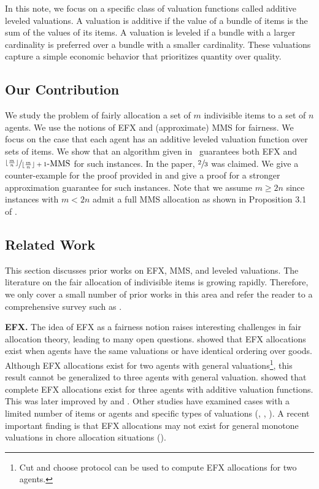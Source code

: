 \documentclass{article}
\theoremstyle{definition}
\begin{document}
In this note, we focus on a specific class of valuation functions called additive leveled valuations. A valuation is additive if the value of a bundle of items is the sum of the values of its items. A valuation is leveled if a bundle with a larger cardinality is preferred over a bundle with a smaller cardinality. These valuations capture a simple economic behavior that prioritizes quantity over quality.

\subsection{Our Contribution}

We study the problem of fairly allocation a set of $m$ indivisible items to a set of $n$ agents. We use the notions of EFX and (approximate) MMS for fairness. We focus on the case that each agent has an additive leveled valuation function over sets of items. We show that an algorithm given in~\cite{christodoulou2024fairtruthfulallocationsleveled} guarantees both EFX and $\sfrac{\lfloor \frac{m}{n} \rfloor}{\lfloor \frac{m}{n} \rfloor + 1}\text{-MMS}$ for such instances. In the paper, $\sfrac{2}{3}$ was claimed. We give a counter-example for the proof provided in \cite{christodoulou2024fairtruthfulallocationsleveled} and give a proof for a stronger approximation guarantee for such instances. Note that we assume $m \ge 2n$ since instances with $m < 2n$ admit a full MMS allocation as shown in Proposition 3.1 of \cite{christodoulou2024fairtruthfulallocationsleveled}.

\subsection{Related Work}

This section discusses prior works on EFX, MMS, and leveled valuations. The literature on the fair allocation of indivisible items is growing rapidly. Therefore, we only cover a small number of prior works in this area and refer the reader to a comprehensive survey such as \cite{Amanatidis_2023}.


\textbf{EFX.}
The idea of EFX as a fairness notion raises interesting challenges in fair allocation theory, leading to many open questions. \cite{DBLP:journals/corr/PlautR17} showed that EFX allocations exist when agents have the same valuations or have identical ordering over goods. Although EFX allocations exist for two agents with general valuations\footnote{Cut and choose protocol can be used to compute EFX allocations for two agents.}, this result cannot be generalized to three agents with general valuation.
\cite{DBLP:journals/corr/abs-2002-05119} showed that complete EFX allocations exist for three agents with additive valuation functions. This was later improved by \cite{DBLP:journals/corr/abs-2102-10654} and \cite{57690578beb44ed8a8923cc540ed32c6}.  
Other studies have examined cases with a limited number of items or agents and specific types of valuations (\cite{DBLP:journals/corr/abs-1909-07650}, \cite{DBLP:journals/corr/abs-2008-08798}, \cite{10.1287/moor.2022.0044}). A recent important finding is that EFX allocations may not exist for general monotone valuations in chore allocation situations (\cite{christoforidis2024pursuitefxchoresnonexistence}).
\end{document}
